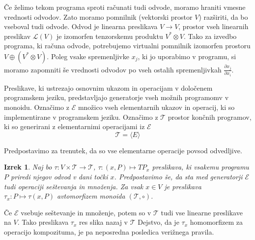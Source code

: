 \documentclass{article}
\newcommand{\E}{\mathcal{E}}
\newcommand{\T}{\mathcal{T}}
\newtheorem{izrek}{Izrek}[section]
\begin{document}
Če želimo tekom programa sproti računati tudi odvode, moramo hraniti vmesne
vrednosti odvodov. Zato moramo pomnilnik (vektorski prostor $V$) razširiti, da
bo vseboval tudi odvode. Odvod je linearna preslikava $V\to V$, prostor
vseh linearnih preslikav $\mathcal{L}(V)$ je izomorfen tenzorskemu produktu
$V^*\otimes V$. Tako za izvedbo programa, ki računa odvode, potrebujemo virtualni
pomnilnik izomorfen prostoru $V\oplus (V^*\otimes V)$. Poleg vsake spremenljivke $x_j$, ki
jo uporabimo v programu, si moramo zapomniti še vrednosti odvodov po vseh
ostalih spremenljivkah $\frac{\partial x_j}{\partial x_i}$.  
 
Preslikave, ki ustrezajo osnovnim ukazom in operacijam v določenem
programskem jeziku, predstavljajo generatorje vseh možnih programomv v
monoidu. Označimo z $\E$ množico vseh elementarnih ukazov in operacij, ki so
implementirane v programskem jeziku. Označimo z $\T$ prostor končnih programov,
ki so generirani z elementarnimi operacijami iz $\E$
\begin{equation*}
  \T=\langle E \rangle
\end{equation*}

Predpostavimo za trenutek, da so vse elementarne operacije povsod odvedljive. 

\begin{izrek}
  Naj bo $\tau:V\times \T\to \T$, $\tau:(x,P)\mapsto TP_x$ preslikava,  ki vsakemu programu
  $P$ priredi njegov odvod v dani točki $x$. Predpostavimo še, da sta med generatorji $\E$
  tudi operaciji seštevanja in množenja. Za vsak $x\in V$ je preslikava
  $\tau_x:P\mapsto \tau(x,P)$ avtomorfizem monoida $(\T,\circ)$. 
\end{izrek}
Če $\E$ vsebuje seštevanje in množenje, potem so v $\T$ tudi vse linearne preslikave
na $V$. Tako preslikava $\tau_x$ res slika nazaj v $\T$ Dejstvo, da je $\tau_x$ homomorfizem za operacijo kompozituma, je pa 
neposredna posledica verižnega pravila.
\end{document}
